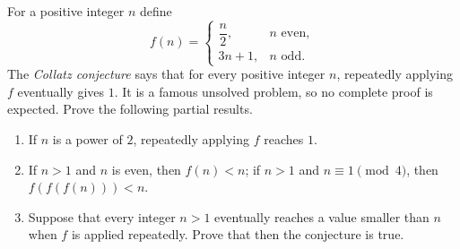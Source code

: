 For a positive integer $n$ define
\[f(n)=\begin{cases}\dfrac n2,&n\text{ even},\\3n+1,&n\text{ odd}.\end{cases}\]
The \emph{Collatz conjecture} says that for every positive integer $n$, repeatedly applying $f$ eventually gives $1$. It is a famous unsolved problem, so no complete proof is expected. Prove the following partial results.
\begin{enumerate}
\item[(a)] If $n$ is a power of $2$, repeatedly applying $f$ reaches $1$.
\item[(b)] If $n>1$ and $n$ is even, then $f(n)<n$; if $n>1$ and $n\equiv1\pmod4$, then $f(f(f(n)))<n$.
\item[(c)] Suppose that every integer $n>1$ eventually reaches a value smaller than $n$ when $f$ is applied repeatedly. Prove that then the conjecture is true.
\end{enumerate}
